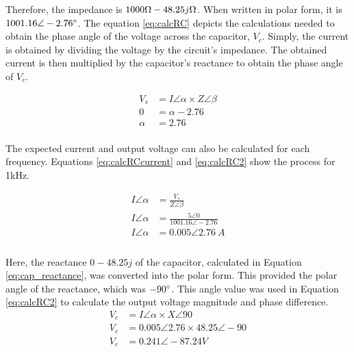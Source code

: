 \documentclass[journal]{IEEEtran}
\begin{document}
\noindent Therefore, the impedance is $1000\ohm - 48.25j\ohm$. When written in polar form, it is $1001.16 \angle-2.76\degree$. The equation \ref{eq:calcRC} depicts the calculations needed to obtain the phase angle of the voltage across the capacitor, $V_{c}$. Simply, the current is obtained by dividing the voltage by the circuit's impedance. The obtained current is then multiplied by the capacitor's reactance to obtain the phase angle of $V_c$.

\begin{equation}
    \begin{split}
        V_s & = I \angle \alpha \times Z \angle \beta \\
        0 & = \alpha - 2.76 \\
        \alpha & = 2.76 
    \end{split}
    \label{eq:calcRC}
\end{equation} \\

\noindent The expected current and output voltage can also be calculated for each frequency. Equations \ref{eq:calcRCcurrent} and \ref{eq:calcRC2} show the process for 1kHz. 

  
        
\begin{equation}
    \begin{split}
        I \angle \alpha & = \frac{V_s}{Z \angle \beta} \\
        I \angle \alpha & = \frac{5 \angle 0}{1001.16 \angle -2.76}\\
        I \angle \alpha & = 0.005 \angle 2.76 \ A\\
    \end{split}
    \label{eq:calcRCcurrent}
\end{equation} \\

\noindent Here, the reactance $0 - 48.25j$ of the capacitor, calculated in Equation \ref{eq:cap_reactance}, was converted into the polar form. This provided the polar angle of the reactance, which was $-90\degree$. This angle value was used in Equation \ref{eq:calcRC2} to calculate the output voltage magnitude and phase difference. \\

\begin{equation}
    \begin{split}
        V_c & = I \angle \alpha \times X \angle 90 \\
        V_c & =  0.005 \angle 2.76 \times 48.25 \angle -90 \\
        V_c & = 0.241 \angle -87.24 V \\
    \end{split}
    \label{eq:calcRC2}
\end{equation} \\
\end{document}
